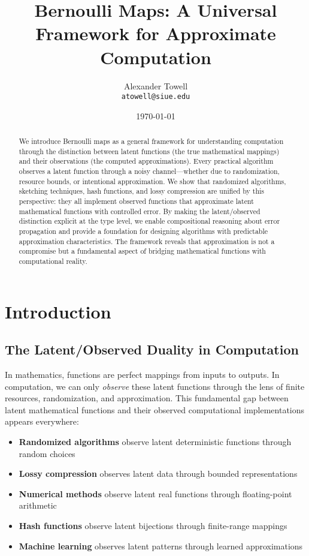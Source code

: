 \documentclass[11pt,final,hidelinks]{article}
\title{Bernoulli Maps: A Universal Framework for Approximate Computation}
\author{
    Alexander Towell\\
    \texttt{atowell@siue.edu}
}
\date{\today}
\begin{document}
\maketitle

\begin{abstract}
We introduce Bernoulli maps as a general framework for understanding computation through the distinction between latent functions (the true mathematical mappings) and their observations (the computed approximations). Every practical algorithm observes a latent function through a noisy channel—whether due to randomization, resource bounds, or intentional approximation. We show that randomized algorithms, sketching techniques, hash functions, and lossy compression are unified by this perspective: they all implement observed functions that approximate latent mathematical functions with controlled error. By making the latent/observed distinction explicit at the type level, we enable compositional reasoning about error propagation and provide a foundation for designing algorithms with predictable approximation characteristics. The framework reveals that approximation is not a compromise but a fundamental aspect of bridging mathematical functions with computational reality.
\end{abstract}

\section{Introduction}

\subsection{The Latent/Observed Duality in Computation}

In mathematics, functions are perfect mappings from inputs to outputs. In computation, we can only \emph{observe} these latent functions through the lens of finite resources, randomization, and approximation. This fundamental gap between latent mathematical functions and their observed computational implementations appears everywhere:

\begin{itemize}
    \item \textbf{Randomized algorithms} observe latent deterministic functions through random choices
    \item \textbf{Lossy compression} observes latent data through bounded representations
    \item \textbf{Numerical methods} observe latent real functions through floating-point arithmetic
    \item \textbf{Hash functions} observe latent bijections through finite-range mappings
    \item \textbf{Machine learning} observes latent patterns through learned approximations
\end{itemize}
\end{document}
